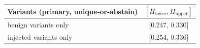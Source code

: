 \begin{tabular}{lc}
\toprule
Variants (primary, unique-or-abstain) & $[H_{\mathrm{lower}}, H_{\mathrm{upper}}]$ \\
\midrule
benign variants only & [0.247, 0.330] \\
injected variants only & [0.254, 0.336] \\
\bottomrule
\end{tabular}
